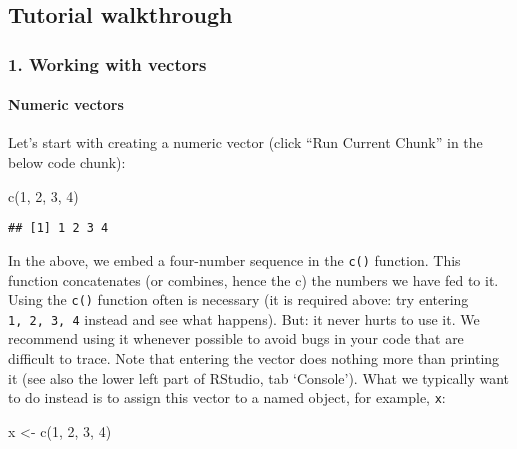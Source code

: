 \documentclass[
]{article}
\newenvironment{Shaded}{\begin{snugshade}}{\end{snugshade}}
\newcommand{\DecValTok}[1]{\textcolor[rgb]{0.00,0.00,0.81}{#1}}
\newcommand{\FunctionTok}[1]{\textcolor[rgb]{0.00,0.00,0.00}{#1}}
\newcommand{\NormalTok}[1]{#1}
\newcommand{\OtherTok}[1]{\textcolor[rgb]{0.56,0.35,0.01}{#1}}
\begin{document}
\hypertarget{tutorial-walkthrough}{%
\subsection{Tutorial walkthrough}\label{tutorial-walkthrough}}

\hypertarget{working-with-vectors}{%
\subsubsection{1. Working with vectors}\label{working-with-vectors}}

\hypertarget{numeric-vectors}{%
\paragraph{Numeric vectors}\label{numeric-vectors}}

Let's start with creating a numeric vector (click ``Run Current Chunk''
in the below code chunk):

\begin{Shaded}
\begin{Highlighting}[]
\FunctionTok{c}\NormalTok{(}\DecValTok{1}\NormalTok{, }\DecValTok{2}\NormalTok{, }\DecValTok{3}\NormalTok{, }\DecValTok{4}\NormalTok{)}
\end{Highlighting}
\end{Shaded}

\begin{verbatim}
## [1] 1 2 3 4
\end{verbatim}

In the above, we embed a four-number sequence in the \texttt{c()}
function. This function concatenates (or combines, hence the c) the
numbers we have fed to it. Using the \texttt{c()} function often is
necessary (it is required above: try entering \texttt{1,\ 2,\ 3,\ 4}
instead and see what happens). But: it never hurts to use it. We
recommend using it whenever possible to avoid bugs in your code that are
difficult to trace. Note that entering the vector does nothing more than
printing it (see also the lower left part of RStudio, tab `Console').
What we typically want to do instead is to assign this vector to a named
object, for example, \texttt{x}:

\begin{Shaded}
\begin{Highlighting}[]
\NormalTok{x }\OtherTok{\textless{}{-}} \FunctionTok{c}\NormalTok{(}\DecValTok{1}\NormalTok{, }\DecValTok{2}\NormalTok{, }\DecValTok{3}\NormalTok{, }\DecValTok{4}\NormalTok{)}
\end{Highlighting}
\end{Shaded}
\end{document}
